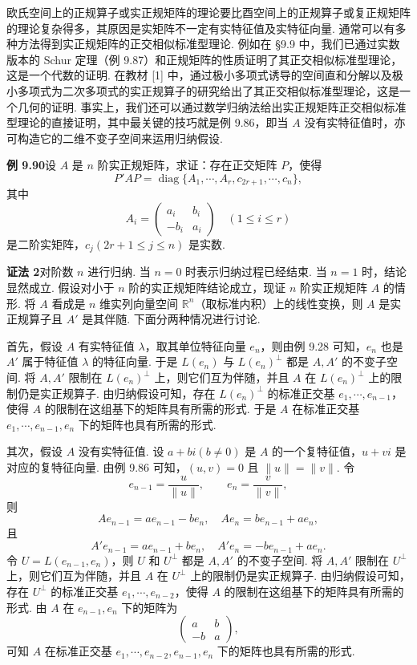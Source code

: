 \documentclass[UTF8,12pt,a4paper,fontset=fandol]{ctexart}
\begin{document}
欧氏空间上的正规算子或实正规矩阵的理论要比酉空间上的正规算子或复正规矩阵的理论复杂得多，其原因是实矩阵不一定有实特征值及实特征向量. 通常可以有多种方法得到实正规矩阵的正交相似标准型理论. 例如在 §9.9 中，我们已通过实数版本的 Schur 定理（例 9.87）和正规矩阵的性质证明了其正交相似标准型理论，这是一个代数的证明. 在教材 [1] 中，通过极小多项式诱导的空间直和分解以及极小多项式为二次多项式的实正规算子的研究给出了其正交相似标准型理论，这是一个几何的证明. 事实上，我们还可以通过数学归纳法给出实正规矩阵正交相似标准型理论的直接证明，其中最关键的技巧就是例 9.86，即当 $A$ 没有实特征值时，亦可构造它的二维不变子空间来运用归纳假设.

\noindent\textbf{例 9.90}\quad 设 $A$ 是 $n$ 阶实正规矩阵，求证：存在正交矩阵 $P$，使得
\[
P'AP=\operatorname{diag}\{A_1,\cdots,A_r,c_{2r+1},\cdots,c_n\},
\]
其中
\[
A_i=\begin{pmatrix}
a_i&b_i\\
-b_i&a_i
\end{pmatrix}\quad (1\le i\le r)
\]
是二阶实矩阵，$c_j(2r+1\le j\le n)$ 是实数.

\noindent\textbf{证法 2}\quad 对阶数 $n$ 进行归纳. 当 $n=0$ 时表示归纳过程已经结束. 当 $n=1$ 时，结论显然成立. 假设对小于 $n$ 阶的实正规矩阵结论成立，现证 $n$ 阶实正规矩阵 $A$ 的情形. 将 $A$ 看成是 $n$ 维实列向量空间 $\mathbb{R}^n$（取标准内积）上的线性变换，则 $A$ 是实正规算子且 $A'$ 是其伴随. 下面分两种情况进行讨论.

首先，假设 $A$ 有实特征值 $\lambda$，取其单位特征向量 $e_n$，则由例 9.28 可知，$e_n$ 也是 $A'$ 属于特征值 $\lambda$ 的特征向量. 于是 $L(e_n)$ 与 $L(e_n)^\perp$ 都是 $A,A'$ 的不变子空间. 将 $A,A'$ 限制在 $L(e_n)^\perp$ 上，则它们互为伴随，并且 $A$ 在 $L(e_n)^\perp$ 上的限制仍是实正规算子. 由归纳假设可知，存在 $L(e_n)^\perp$ 的标准正交基 $e_1,\cdots,e_{n-1}$，使得 $A$ 的限制在这组基下的矩阵具有所需的形式. 于是 $A$ 在标准正交基 $e_1,\cdots,e_{n-1},e_n$ 下的矩阵也具有所需的形式.

其次，假设 $A$ 没有实特征值. 设 $a+bi(b\ne0)$ 是 $A$ 的一个复特征值，$u+vi$ 是对应的复特征向量. 由例 9.86 可知，$(u,v)=0$ 且 $\|u\|=\|v\|$. 令
\[
e_{n-1}=\frac{u}{\|u\|},\qquad e_n=\frac{v}{\|v\|},
\]
则
\[
Ae_{n-1}=ae_{n-1}-be_n,\quad Ae_n=be_{n-1}+ae_n,
\]
且
\[
A'e_{n-1}=ae_{n-1}+be_n,\quad A'e_n=-be_{n-1}+ae_n.
\]
令 $U=L(e_{n-1},e_n)$，则 $U$ 和 $U^\perp$ 都是 $A,A'$ 的不变子空间. 将 $A,A'$ 限制在 $U^\perp$ 上，则它们互为伴随，并且 $A$ 在 $U^\perp$ 上的限制仍是实正规算子. 由归纳假设可知，存在 $U^\perp$ 的标准正交基 $e_1,\cdots,e_{n-2}$，使得 $A$ 的限制在这组基下的矩阵具有所需的形式. 由 $A$ 在 $e_{n-1},e_n$ 下的矩阵为
\[
\begin{pmatrix}
a&b\\
-b&a
\end{pmatrix},
\]
可知 $A$ 在标准正交基 $e_1,\cdots,e_{n-2},e_{n-1},e_n$ 下的矩阵也具有所需的形式.
\end{document}

